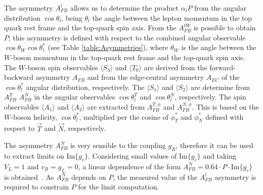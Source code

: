 The asymmetry $A_{FB}^{l}$ allows us to determine the product $\alpha_l P$ from the angular distribution $\cos \theta_l$, being $\theta_l$ the angle between the lepton momentum in the top quark rest frame and the top-quark spin axis. From the $A_{FB}^{tW}$ is possible to obtain $P$; this asymmetry is defined with respect to the combined angular observable $\cos \theta_{W}\cos \theta_{l}^{*}$ (see Table \ref{table:Asymmetries}), where $\theta_W$ is the angle between the $W$-boson momentum in the top-quark rest frame and the top-quark spin axis. The $W$-boson spin observables $\langle S_{3} \rangle$ and $\langle T_{0} \rangle$ are derived from the forward-backward asymmetry $A_{FB}$ and from the edge-central asymmetry $A_{EC}$ of the $\cos \theta_l^{*}$ angular distribution, respectively. The $\langle S_{1} \rangle$ and $\langle S_{2} \rangle$ are determine from $A^T_{FB}$ $A^N_{FB}$ in the angular observables $\cos \theta_l^T$ and $\cos \theta_l^N$, respectively. The spin observables $\langle A_{1} \rangle$ and $\langle A_{2} \rangle$ are extracted from $A_{FB}^{T,\phi}$ and $A_{FB}^{N,\phi}$. This is based on the $W$-boson helicity, $\cos\theta_l^{*}$, multiplied per the cosine of $\phi_{T}^{*}$ and $\phi_{N}^{*}$ defined with respect to $\overrightarrow{T}$ and $\overrightarrow{N}$, respectively.

The asymmetry $A_{FB}^{N}$ is very sensible to the coupling $g_R$, therefore it can be used to extract limits on Im$\{g_r \}$. Considering small values of Im$\{g_r \}$ and taking $V_L =1$ and $v_R=g_L=0$, a linear dependence of the form $A^N_{FB}=0.64\cdot P \cdot$Im$\{g_r \}$ is obtained~\cite{AguilarSaavedra:2010nx}. As $A^N_{FB}$ depends on $P$, the measured value of the $A^l_{FB}$ asymmetry is required to constrain $P$ for the limit computation. %


